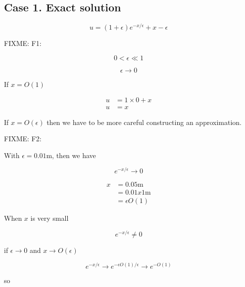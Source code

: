 \subsection{Case 1.  Exact solution}

\begin{equation}\label{eqn:continuumL20:50}
u = ( 1 + \epsilon ) e^{-x/\epsilon} + x - \epsilon
\end{equation}

FIXME: F1:

\begin{equation}\label{eqn:continuumL20:70}
0 < \epsilon \ll 1
\end{equation}

\begin{equation}\label{eqn:continuumL20:90}
\epsilon \rightarrow 0
\end{equation}

If $x = O(1)$

\begin{align*}
u &= 1 \times 0 + x \\
u &= x
\end{align*}

If $x = O(\epsilon)$ then we have to be more careful constructing an approximation.

FIXME: F2:

With $\epsilon = 0.01 \text{m}$, then we have

\begin{equation}\label{eqn:continuumL20:110}
e^{-x/\epsilon} \rightarrow 0
\end{equation}

\begin{align*}
x 
&= 0.05 \text{m} \\
&= 0.01 x 1 \text{m} \\
&= \epsilon O(1)
\end{align*}

When $x$ is very small

\begin{equation}\label{eqn:continuumL20:130}
e^{-x/\epsilon} \ne 0
\end{equation}

if $\epsilon \rightarrow 0$ and $x \rightarrow O(\epsilon)$

\begin{equation}\label{eqn:continuumL20:150}
e^{-x/\epsilon} \rightarrow e^{-\epsilon O(1) /\epsilon} \rightarrow e^{-O(1)}
\end{equation}

so 

